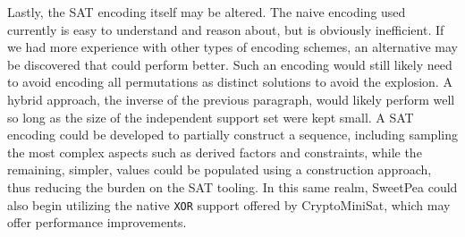 Lastly, the SAT encoding itself may be altered. The naive encoding used currently is easy to understand and reason about, but is obviously inefficient. If we had more experience with other types of encoding schemes, an alternative may be discovered that could perform better. Such an encoding would still likely need to avoid encoding all permutations as distinct solutions to avoid the explosion. A hybrid approach, the inverse of the previous paragraph, would likely perform well so long as the size of the independent support set were kept small. A SAT encoding could be developed to partially construct a sequence, including sampling the most complex aspects such as derived factors and constraints, while the remaining, simpler, values could be populated using a construction approach, thus reducing the burden on the SAT tooling. In this same realm, SweetPea could also begin utilizing the native \texttt{XOR} support offered by CryptoMiniSat, which may offer performance improvements.


